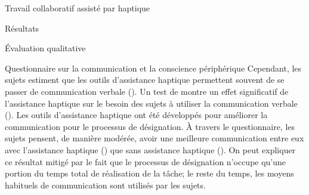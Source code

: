 \documentclass[myfrancais,ngerman,english,french]{mythesis}
\begin{document}
\begin{mychapter}{Travail collaboratif assisté par haptique}
\begin{mysection}{Résultats}
\begin{mysubsection}{Évaluation qualitative}
\begin{mysubsubsection}{Questionnaire sur la communication et la conscience périphérique}
					Cependant, les sujets estiment que les outils d'assistance haptique permettent souvent de se passer de communication verbale ().
					Un test de  montre un effet significatif de l'assistance haptique sur le besoin des sujets à utiliser la communication verbale ().
					Les outils d'assistance haptique ont été développés pour améliorer la communication pour le processus de désignation.
					À travers le questionnaire, les sujets pensent, de manière modérée, avoir une meilleure communication entre eux avec l'assistance haptique () que sans assistance haptique ().
					On peut expliquer ce résultat mitigé par le fait que le processus de désignation n'occupe qu'une portion du temps total de réalisation de la tâche; le reste du temps, les moyens habituels de communication sont utilisés par les sujets.


\end{mysubsubsection}
\end{mysubsection}
\end{mysection}
\end{mychapter}
\end{document}
